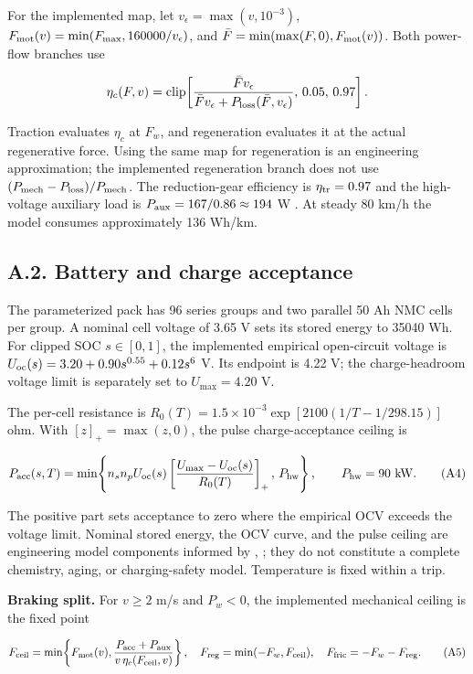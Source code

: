 \documentclass[letterpaper,journal,onecolumn]{IEEEtran}
\begin{document}
For the implemented map, let \(v_\epsilon=\max(v,10^{-3})\), \(F_{\rm mot}(v)=\min(F_{\max},160000/v_\epsilon)\), and \(\bar F=\min(\max(F,0),F_{\rm mot}(v))\). Both power-flow branches use

\[\eta_c(F,v)=\operatorname{clip}\!\left[
\frac{\bar Fv_\epsilon}{\bar Fv_\epsilon+P_{\rm loss}(\bar F,v_\epsilon)},\,0.05,\,0.97
\right].\]

Traction evaluates \(\eta_c\) at \(F_w\), and regeneration evaluates it at the actual regenerative force. Using the same map for regeneration is an engineering approximation; the implemented regeneration branch does not use \((P_{\rm mech}-P_{\rm loss})/P_{\rm mech}\). The reduction-gear efficiency is \(\eta_{\rm tr}=0.97\) and the high-voltage auxiliary load is \(P_{\rm aux}=167/0.86\approx194\) W \cite{S4}. At steady 80 km/h the model consumes approximately 136 Wh/km.

\subsection*{A.2. Battery and charge acceptance}

The parameterized pack has 96 series groups and two parallel 50 Ah NMC cells per group. A nominal cell voltage of 3.65 V sets its stored energy to 35040 Wh. For clipped SOC \(s\in[0,1]\), the implemented empirical open-circuit voltage is \(U_{\rm oc}(s)=3.20+0.90s^{0.55}+0.12s^6\) V. Its endpoint is 4.22 V; the charge-headroom voltage limit is separately set to \(U_{\max}=4.20\) V.

The per-cell resistance is \(R_0(T)=1.5\times10^{-3}\exp[2100(1/T-1/298.15)]\) ohm. With \([z]_+=\max(z,0)\), the pulse charge-acceptance ceiling is

\[P_{\rm acc}(s,T)=
\min\!\left\{
n_sn_pU_{\rm oc}(s)
\left[\frac{U_{\max}-U_{\rm oc}(s)}{R_0(T)}\right]_+,\,
P_{\rm hw}
\right\},\qquad P_{\rm hw}=90\ {\rm kW}. \tag{A4}\]

The positive part sets acceptance to zero where the empirical OCV exceeds the voltage limit. Nominal stored energy, the OCV curve, and the pulse ceiling are engineering model components informed by \cite{S3}, \cite{S5}; they do not constitute a complete chemistry, aging, or charging-safety model. Temperature is fixed within a trip.

\textbf{Braking split.} For \(v\ge2\) m/s and \(P_w<0\), the implemented mechanical ceiling is the fixed point

\[F_{\rm ceil}
=\min\!\left\{F_{\rm mot}(v),
\frac{P_{\rm acc}+P_{\rm aux}}{v\,\eta_c(F_{\rm ceil},v)}\right\},
\quad F_{\rm reg}=\min(-F_w,F_{\rm ceil}),
\quad F_{\rm fric}=-F_w-F_{\rm reg}. \tag{A5}\]
\end{document}
